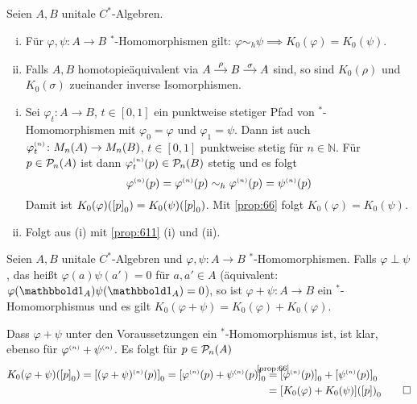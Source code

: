 \begin{proposition}[label=prop:613]
	Seien $A,B$ unitale $C^*$-Algebren.
	\begin{enumerate}[(i)]
		\item Für $\varphi, \psi \colon A \to B$ $^*$-Homomorphismen gilt: $\varphi \sim_h \psi \implies K_0(\varphi) = K_0(\psi)$.
		\item Falls $A,B$ homotopieäquivalent via $\begin{tikzcd}[cramped,sep=small] A \rar["\rho"] & B \rar["\sigma"] & A \end{tikzcd}$ sind, so sind $K_0(\rho)$ und $K_0(\sigma)$ zueinander inverse Isomorphismen.
	\end{enumerate}
\end{proposition}
\begin{beweis}
	\begin{enumerate}[(i)]
		\item Sei $\varphi_t \colon A \to B$, $t \in [0,1]$ ein punktweise stetiger Pfad von $^*$-Homomorphismen mit $\varphi_0 = \varphi$ und $\varphi_1 = \psi$.
		Dann ist auch $\varphi_t^{\scriptscriptstyle(n)} \colon M_n(A) \to M_n(B)$, $t \in [0,1]$ punktweise stetig für $n \in \mathbb{N}$.
		Für $p \in \mathcal{P}\mkern-2mu_n(A)$ ist dann $\varphi_t^{\scriptscriptstyle(n)}(p) \in \mathcal{P}\mkern-2mu_n(B)$ stetig und es folgt
		\[
			\varphi^{\scriptscriptstyle(n)}(p) = \varphi^{\scriptscriptstyle(n)}(p) \sim_h \varphi^{\scriptscriptstyle(n)}(p) = \psi^{\scriptscriptstyle(n)}(p)
		\]
		Damit ist $K_0(\varphi) \enbrace*{\benbrace*{p}_0} = K_0(\psi) \enbrace*{\benbrace*{p}_0}$.
		Mit \autoref{prop:66} folgt $K_0(\varphi) = K_0(\psi)$.
		\item Folgt aus (i) mit \autoref{prop:611} (i) und (ii). \qedhere
	\end{enumerate}
\end{beweis}

\begin{proposition}[label=prop:614]
	Seien $A,B$ unitale $C^*$-Algebren und $\varphi,\psi \colon A \to B$ $^*$-Homomorphismen.
	Falls $\varphi \perp \psi$, das heißt $\varphi(a) \psi(a') = 0$ für $a,a' \in A$ (äquivalent: $\varphi(\ind_A) \psi(\ind_A)=0$), so ist $\varphi +\psi \colon A \to B$ ein $^*$-Homomorphismus und es gilt $K_0(\varphi + \psi) = K_0(\varphi) + K_0(\varphi)$.
\end{proposition}
\begin{beweis}
	Dass $\varphi +\psi$ unter den Voraussetzungen ein $^*$-Homomorphismus ist, ist klar, ebenso für $\varphi^{\scriptscriptstyle(n)} + \psi^{\scriptscriptstyle(n)}$.
	Es folgt für $p \in \mathcal{P}\mkern-2mu_n(A)$
	\begin{align}
		K_0(\varphi + \psi) \enbrace*{\benbrace*{p}_0} = \benbrace*{(\varphi + \psi)^\ssbrace{n} (p)}_0 = \benbrace*{\varphi^\ssbrace{n}(p) + \psi^\ssbrace{n}(p)}_0 &\StackTextClap{\ref{prop:66}}{=} \benbrace*{\varphi^\ssbrace{n}(p)}_0 + \benbrace*{\psi^\ssbrace{n}(p)}_0 \\
		&= \benbrace*{K_0(\varphi) + K_0(\psi)} \enbrace*{\benbrace*{p}}_0 \qedhere
	\end{align}
\end{beweis}

